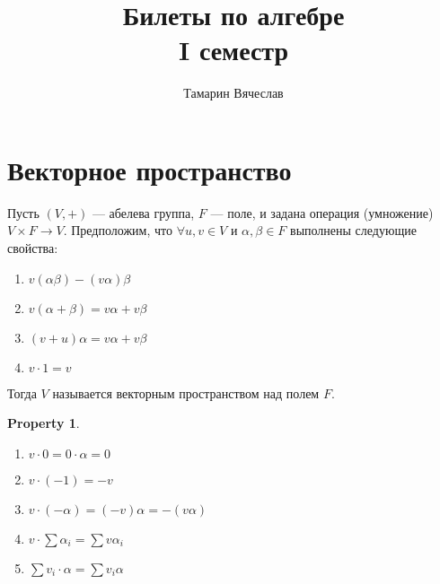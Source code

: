 \documentclass[11pt]{book}
\title{Билеты по алгебре \\ I семестр}
\author{Тамарин Вячеслав}
\theoremstyle{definition}
\theoremstyle{plain}
\theoremstyle{plain}
\newtheorem*{prop}{Property}
\theoremstyle{definition}
\theoremstyle{remark}
\begin{document}
\maketitle

\section{Векторное пространство}
\begin{defn}
    Пусть $ (V, +)$ --- абелева группа,  $ F$ --- поле, и задана операция (умножение)  $ V \times F \to  V$. Предположим, что $ \forall  u, v \in V $ и $ \alpha, \beta \in F$ выполнены следующие свойства:
    \begin{enumerate}
	\item  $ v(\alpha \beta) - (v\alpha)\beta$
	\item  $ v(\alpha+\beta) = v\alpha + v\beta$
	\item  $ (v+u)\alpha = v\alpha+v\beta$
	\item  $ v \cdot 1 = v$
    \end{enumerate}
    Тогда $ V$ называется {\sf векторным пространством} над полем  $ F$.
\end{defn}
\begin{prop}
    $ $
    \begin{enumerate}
	\item $ v \cdot 0 = 0 \cdot \alpha  = 0$
	\item $ v \cdot (-1) = -v$
	\item $ v \cdot (-\alpha) = (-v)\alpha = - (v \alpha)$
	\item $v \cdot \sum \alpha_i = \sum v\alpha_i$
	\item $ \sum v_i \cdot \alpha = \sum v_i\alpha$
    \end{enumerate}
\end{prop}
\end{document}
